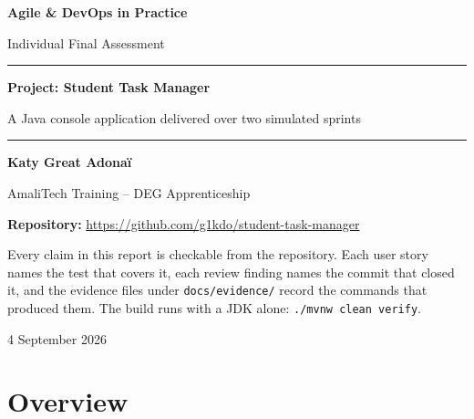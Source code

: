 \documentclass[11pt,a4paper]{article}
\newcommand{\code}[1]{\texttt{\small #1}}
\begin{document}
\begin{titlepage}
\centering
\vspace*{2.5cm}

{\color{accent}\Huge\bfseries Agile \& DevOps in Practice\par}
\vspace{0.6cm}
{\LARGE Individual Final Assessment\par}

\vspace{1.6cm}
\rule{0.75\textwidth}{1pt}\par
\vspace{0.8cm}
{\LARGE\bfseries Project: Student Task Manager\par}
\vspace{0.4cm}
{\large A Java console application delivered over two simulated sprints\par}
\vspace{0.8cm}
\rule{0.75\textwidth}{1pt}\par

\vspace{2.2cm}
{\large\bfseries Katy Great Adona\"i\par}
\vspace{0.3cm}
{\large AmaliTech Training -- DEG Apprenticeship\par}

\vspace{1.8cm}
{\large\textbf{Repository:} \url{https://github.com/g1kdo/student-task-manager}\par}

\vspace{0.5cm}
\begin{minipage}{0.82\textwidth}
\small\centering
Every claim in this report is checkable from the repository. Each user story
names the test that covers it, each review finding names the commit that closed
it, and the evidence files under \code{docs/evidence/} record the commands that
produced them. The build runs with a JDK alone:
\code{./mvnw clean verify}.
\end{minipage}

\vfill
{\large 4 September 2026\par}
\end{titlepage}

\tableofcontents
\newpage

\section{Overview}
\end{document}
